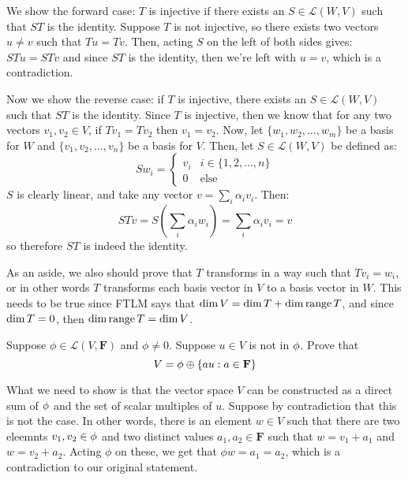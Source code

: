 \documentclass[10pt]{article}
\newcommand{\F}{\mathbf F}
\begin{document}
	\begin{solution}
		We show the forward case: \( T \) is injective if there exists an \( S \in \mathcal L(W, V) \) such that 
		\( ST  \) is the identity. Suppose \( T \) is not injective, so there exists two vectors \( u \neq v \) 
		such that \( Tu = Tv \). Then, acting \( S \) on the left of both sides gives:
		\( STu = STv \) and since \( ST \) is the identity, then we're left with \( u = v \), which is a contradiction. 

		Now we show the reverse case: if \( T \) is injective, there exists an \( S \in \mathcal L(W, V) \) such that 
		\( ST \) is the identity. Since  \( T \) is injective, then we know that for any two vectors 
		\( v_1, v_2 \in V \), if \( Tv_1 = Tv_2 \) then \( v_1 = v_2 \). Now, let \( \{w_1, w_2, \dots, w_m\}  \)
		be a basis for \( W \) and \( \{v_1, v_2, \dots, v_n\}  \) be a basis for \( V \). 
		Then, let \( S \in \mathcal L(W, V)\) be defined as:
		\[
		S w_i = \begin{cases}
			v_i & i \in \{1, 2, \dots, n\}\\
			0 & \text{else}
		\end{cases}
		\] 
		\( S \) is clearly linear, and take any vector \( v = \sum_i \alpha_i v_i \). Then:
		\[
		STv = S\left( \sum_i \alpha_i w_i \right) = \sum_i \alpha_i v_i = v
		\] 
		so therefore \( ST  \) is indeed the identity.

		As an aside, we also should prove that 
		\( T \) transforms in a way such that \( Tv_i = w_i \), or in other words \( T \) transforms 
		each basis vector in \( V \) to a basis vector in \( W \). This needs to be true since FTLM
		says that \( \dim V = \dim \null T + \dim \range T \), and since \( \dim \null T = 0 \), then 
		\( \dim \operatorname*{range} T = \dim V \). 
	\end{solution}
	\begin{problem}
		Suppose \( \phi \in \mathcal L(V, \F) \) and \( \phi \neq 0 \). Suppose \( u \in V \) is not in 
		\( \null \phi \). Prove that
		\[
		V = \null \phi \oplus \{au : a \in \F \} 
		\] 
	\end{problem}

	\begin{solution}
		What we need to show is that the vector space \( V \) can be constructed as a direct sum of 
		\( \null \phi \) and the set of scalar multiples of  \( u \). Suppose by contradiction that this is 
		not the case. In other words, there is an element \( w \in V \) such that there are two eleemnts 
		\( v_1, v_2 \in \null \phi\) and two distinct values \( a_1, a_2 \in \F \) such that \( w = v_1 + a_1 \) and 
		\( w = v_2 + a_2 \). Acting \( \phi \) on these, we get that \( \phi w = a_1 = a_2 \), which 
		is a contradiction to our original statement. 
	\end{solution}
\end{document}
